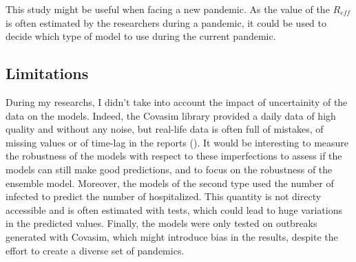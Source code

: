 This study might be useful when facing a new pandemic.
As the value of the $R_{eff}$ is often estimated by the researchers during a pandemic, it could be used to decide which type of model to use during the current pandemic. 


\subsection{Limitations}

During my researchs, I didn't take into account the impact of uncertainity of the data on the models. 
Indeed, the Covasim library provided a daily data of high quality and without any noise, but
real-life data is often full of mistakes, of missing values or of time-lag in the reports (\cite{greene_Nowcasting}).
It would be interesting to measure the robustness of the models with respect to these imperfections to assess if the models can still make good predictions, and to focus on the robustness of the ensemble model. 
Moreover, the models of the second type used the number of infected to predict the number of hospitalized. 
This quantity is not directy accessible and is often estimated with tests, which could lead to huge variations in the predicted values.  
Finally, the models were only tested on outbreaks generated with Covasim, which might introduce bias in the results, despite the effort to create a diverse set of pandemics. 
